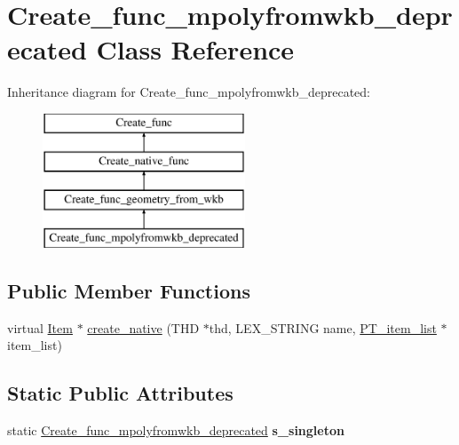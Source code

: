 \hypertarget{classCreate__func__mpolyfromwkb__deprecated}{}\section{Create\+\_\+func\+\_\+mpolyfromwkb\+\_\+deprecated Class Reference}
\label{classCreate__func__mpolyfromwkb__deprecated}
Inheritance diagram for Create\+\_\+func\+\_\+mpolyfromwkb\+\_\+deprecated\+:\begin{figure}[H]
\begin{center}
\leavevmode
\includegraphics[height=4.000000cm]{classCreate__func__mpolyfromwkb__deprecated}
\end{center}
\end{figure}
\subsection*{Public Member Functions}
\begin{DoxyCompactItemize}
\item 
virtual \mbox{\hyperlink{classItem}{Item}} $\ast$ \mbox{\hyperlink{classCreate__func__mpolyfromwkb__deprecated_a54509d67c49eaac43edf999c131c4dc1}{create\+\_\+native}} (T\+HD $\ast$thd, L\+E\+X\+\_\+\+S\+T\+R\+I\+NG name, \mbox{\hyperlink{classPT__item__list}{P\+T\+\_\+item\+\_\+list}} $\ast$item\+\_\+list)
\end{DoxyCompactItemize}
\subsection*{Static Public Attributes}
\begin{DoxyCompactItemize}
\item 
\mbox{\label{classCreate__func__mpolyfromwkb__deprecated_a9a109a03a5218b44bf46351dfb06e98f}} 
static \mbox{\hyperlink{classCreate__func__mpolyfromwkb__deprecated}{Create\+\_\+func\+\_\+mpolyfromwkb\+\_\+deprecated}} {\bfseries s\+\_\+singleton}
\end{DoxyCompactItemize}
